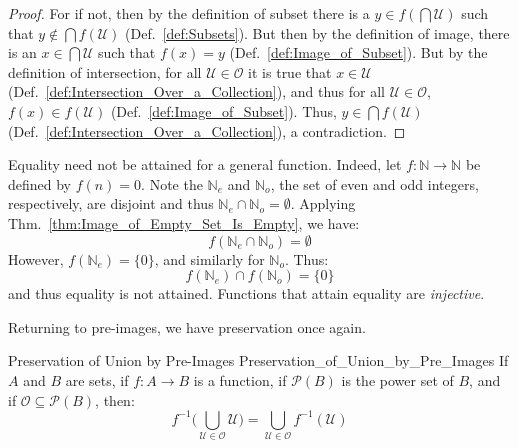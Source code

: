     \begin{proof}
        For if not, then by the definition of subset there is a
        $y\in{f}(\bigcap\mathcal{U})$ such that $y\notin\bigcap{f}(\mathcal{U})$
        (Def.~\ref{def:Subsets}). But then by the definition of image, there is
        an $x\in\bigcap\mathcal{U}$ such that $f(x)=y$
        (Def.~\ref{def:Image_of_Subset}). But by the definition of intersection,
        for all $\mathcal{U}\in\mathcal{O}$ it is true that $x\in\mathcal{U}$
        (Def.~\ref{def:Intersection_Over_a_Collection}), and thus for all
        $\mathcal{U}\in\mathcal{O}$, $f(x)\in{f}(\mathcal{U})$
        (Def.~\ref{def:Image_of_Subset}). Thus,
        $y\in\bigcap{f}(\mathcal{U})$
        (Def.~\ref{def:Intersection_Over_a_Collection}), a contradiction.
    \end{proof}
    \begin{example}
        Equality need not be attained for a general function. Indeed, let
        $f:\mathbb{N}\rightarrow\mathbb{N}$ be defined by
        $f(n)=0$. Note the $\mathbb{N}_{e}$ and $\mathbb{N}_{o}$, the set of
        even and odd integers, respectively, are disjoint and thus
        $\mathbb{N}_{e}\cap\mathbb{N}_{o}=\emptyset$. Applying
        Thm.~\ref{thm:Image_of_Empty_Set_Is_Empty}, we have:
        \begin{equation}
            f(\mathbb{N}_{e}\cap\mathbb{N}_{o})=\emptyset
        \end{equation}
        However, $f(\mathbb{N}_{e})=\{0\}$, and similarly for $\mathbb{N}_{o}$.
        Thus:
        \begin{equation}
            f(\mathbb{N}_{e})\cap{f}(\mathbb{N}_{o})=\{0\}
        \end{equation}
        and thus equality is not attained. Functions that attain equality are
        \textit{injective}.
    \end{example}
    Returning to pre-images, we have preservation once again.
    \begin{ftheorem}{Preservation of Union by Pre-Images}
                    {Preservation_of_Union_by_Pre_Images}
        If $A$ and $B$ are sets, if $f:A\rightarrow{B}$ is a function,
        if $\mathcal{P}(B)$ is the power set of $B$, and if
        $\mathcal{O}\subseteq\mathcal{P}(B)$, then:
        \begin{equation*}
            f^{\minus{1}}\Big(
                \bigcup_{\mathcal{U}\in\mathcal{O}}\mathcal{U}\Big)
            =\bigcup_{\mathcal{U}\in\mathcal{O}}f^{\minus{1}}(\mathcal{U})
        \end{equation*}
    \end{ftheorem}
